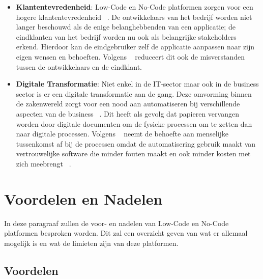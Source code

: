\begin{itemize}
    \item \textbf{Klantentevredenheid}:
    Low-Code en No-Code platformen zorgen voor een hogere klantentevredenheid ~\autocite{Elshan2023}. 
    De ontwikkelaars van het bedrijf worden niet langer beschouwd als de enige belanghebbenden van een applicatie; de eindklanten van het bedrijf worden nu ook als belangrijke stakeholders erkend.
    Hierdoor kan de eindgebruiker zelf de applicatie aanpassen naar zijn eigen wensen en behoeften. 
    Volgens ~\textcite{Elshan2023} reduceert dit ook de misverstanden tussen de ontwikkelaars en de eindklant.

    \item \textbf{Digitale Transformatie}: 
    Niet enkel in de IT-sector maar ook in de business sector is er een digitale transformatie aan de gang. 
    Deze omvorming binnen de zakenwereld zorgt voor een nood aan automatiseren bij verschillende aspecten van de business ~\autocite{ALSAADI_2021}. 
    Dit heeft als gevolg dat papieren vervangen worden door digitale documenten om de fysieke processen om te zetten dan naar digitale processen. 
    Volgens ~\textcite{ALSAADI_2021} neemt de behoefte aan menselijke tussenkomst af bij de processen omdat de automatisering gebruik maakt van vertrouwelijke software die minder fouten maakt en ook minder kosten met zich meebrengt ~\autocite{ALSAADI_2021}.
  \end{itemize} 

\section{Voordelen en Nadelen}
\label{sec:voordelen-nadelen}
In deze paragraaf zullen de voor- en nadelen van Low-Code en No-Code platformen besproken worden. Dit zal
een overzicht geven van wat er allemaal mogelijk is en wat de limieten zijn van deze platformen.
\subsection{Voordelen}%
\label{subsec:voordelen}
